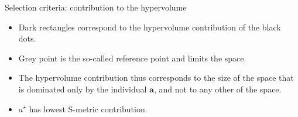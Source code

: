 \begin{frame}[allowframebreaks]{Selection criteria: contribution to the hypervolume}
\vspace*{-0.5cm}
\begin{itemize}
\item Dark rectangles correspond to the hypervolume contribution of the black dots.
\item Grey point is the so-called reference point and limits the space.
\item The hypervolume contribution thus corresponds to the size of the space that is dominated only by the individual $\bm{a}$, and not to any other of the space.
\item $a^\star$ has lowest S-metric contribution.
\end{itemize}
\end{frame}





